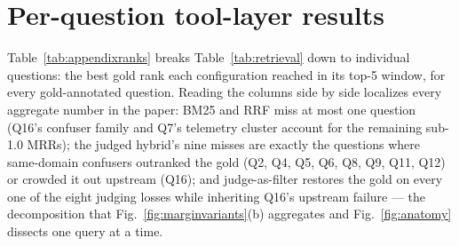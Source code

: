 \documentclass[preprint,12pt]{elsarticle}
\begin{document}
\appendix
\setcounter{table}{0}
\section{Per-question tool-layer results}
\label{app:perq}
Table~\ref{tab:appendixranks} breaks Table~\ref{tab:retrieval} down to
individual questions: the best gold rank each configuration reached in
its top-5 window, for every gold-annotated question. Reading the columns
side by side localizes every aggregate number in the paper: BM25 and RRF
miss at most one question (Q16's confuser family and Q7's telemetry
cluster account for the remaining sub-1.0 MRRs); the judged hybrid's nine
misses are exactly the questions where same-domain confusers outranked
the gold (Q2, Q4, Q5, Q6, Q8, Q9, Q11, Q12) or crowded it out upstream
(Q16); and judge-as-filter restores the gold on every one of the eight
judging losses while inheriting Q16's upstream failure --- the
decomposition that Fig.~\ref{fig:marginvariants}(b) aggregates and
Fig.~\ref{fig:anatomy} dissects one query at a time.





\end{document}
